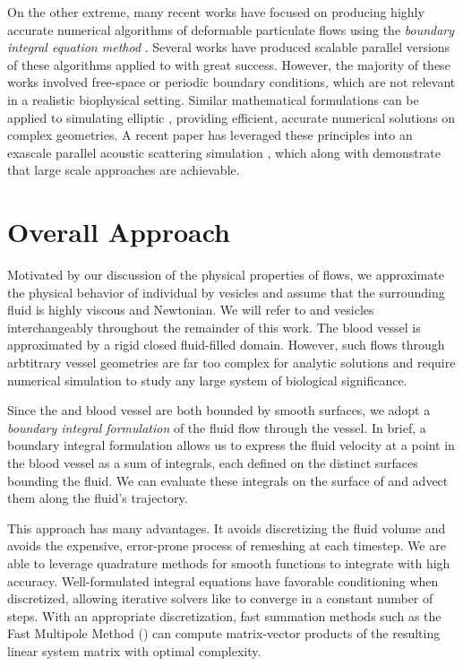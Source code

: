On the other extreme, many recent works have focused on producing highly accurate numerical algorithms of deformable particulate flows using the \textit{boundary integral equation method} \cite{Veerapaneni2009b,Veerapaneni2011,rahimian2015,sorgentone2018highly,sorgentone20193d,af2016fast,Zhao2010}.
Several works \cite{lu2018parallel,Malhotra2017,rahimian2010petascale} have produced scalable parallel versions of these algorithms applied to \rbcs with great success.
However, the majority of these works involved free-space or periodic boundary conditions, which are not relevant in a realistic biophysical setting.
Similar mathematical formulations can be applied to simulating elliptic \pdes \cite{YBZ,wala20183d,wala2018optimization,bruno2013high}, providing efficient, accurate numerical solutions on complex geometries.
A recent paper has leveraged these principles into an exascale parallel acoustic scattering simulation \cite{abduljabbar2019extreme}, which along with \cite{rahimian2010petascale} demonstrate that large scale \bie approaches are achievable.

\section{Overall Approach}
Motivated by our discussion of the physical properties of \rbc flows, we approximate the physical behavior of individual \rbcs by vesicles and assume that the surrounding fluid is highly viscous and Newtonian.
We will refer to \rbcs and vesicles interchangeably throughout the remainder of this work.
The blood vessel is approximated by a rigid closed fluid-filled domain. 
However, such flows through arbtitrary vessel geometries are far too complex for analytic solutions and require numerical simulation to study any large system of biological significance.

Since the \rbcs and blood vessel are both bounded by smooth surfaces, we adopt a \textit{boundary integral formulation} of the fluid flow through the vessel.
In brief, a boundary integral formulation allows us to express the fluid velocity at a point in the blood vessel as a sum of integrals, each defined on the distinct surfaces bounding the fluid.
We can evaluate these integrals on the surface of \rbcs and advect them along the fluid's trajectory. 

This approach has many advantages. 
It avoids discretizing the fluid volume and avoids the expensive, error-prone process of remeshing at each timestep.
We are able to leverage quadrature methods for smooth functions to integrate with high accuracy.
Well-formulated integral equations have favorable conditioning when discretized, allowing iterative solvers like \gmres to converge in a constant number of steps.
With an appropriate discretization, fast summation methods such as the Fast Multipole Method (\fmm) can compute matrix-vector products of the resulting linear system matrix with optimal complexity.


